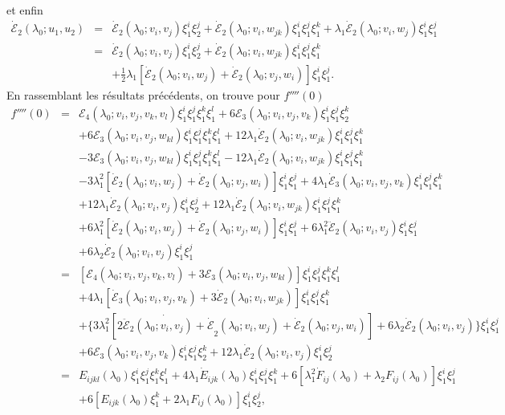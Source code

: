 \documentclass{article}
\begin{document}
et enfin
\begin{eqnarray*}
  \dot{\mathcal{E}}_2 (λ_0 ; u_1, u_2) & = & \dot{\mathcal{E}}_2
  (λ_0 ; v_i, v_j) \xi_1^i \xi_2^j + \dot{\mathcal{E}}_2 (λ_0 ;
  v_i, w_{j  k}) \xi_1^i \xi_1^j \xi_1^k + λ_1
  \dot{\mathcal{E}}_2 (λ_0 ; v_i, w_j) \xi_1^i \xi_1^j\\
  & = & \dot{\mathcal{E}}_2 (λ_0 ; v_i, v_j) \xi_1^i \xi_2^j +
  \dot{\mathcal{E}}_2 (λ_0 ; v_i, w_{j  k}) \xi_1^i \xi_1^j
  \xi_1^k\\
  &  &  + \tfrac{1}{2} λ_1  [\dot{\mathcal{E}}_2 (λ_0 ;
  v_i, w_j) + \dot{\mathcal{E}}_2 (λ_0 ; v_j, w_i)] \xi_1^i \xi_1^j .
\end{eqnarray*}
En rassemblant les résultats précédents, on trouve pour $f''''
(0)$
\begin{eqnarray*}
  f'''' (0) & = & \mathcal{E}_4 (λ_0 ; v_i, v_j, v_k {, v_l} ) \xi_1^i
  \xi_1^j \xi_1^k \xi_1^l + 6\mathcal{E}_3 (λ_0 ; v_i, v_j, v_k) \xi_1^i
  \xi_1^j \xi_2^k\\
  &  &  + 6\mathcal{E}_3 (λ_0 ; v_i, v_j, w_{k  l})
  \xi_1^i \xi_1^j \xi_1^k \xi_1^l + 12 λ_1  \dot{\mathcal{E}}_2
  (λ_0 ; v_{i }, w_{j  k}) \xi_1^i \xi_1^j \xi_1^k\\
  &  &  - 3\mathcal{E}_3 (λ_0 ; v_i, v_j, w_{k  l})
  \xi_1^i \xi_1^j \xi_1^k \xi_1^l - 12 λ_1  \dot{\mathcal{E}}_2
  (λ_0 ; v_i, w_{j  k}) \xi_1^i \xi_1^j \xi_1^k\\
  &  &  - 3 λ_1^2  [\dot{\mathcal{E}}_2 (λ_0 ; v_i, w_j)
  + \dot{\mathcal{E}}_2 (λ_0 ; v_j, w_i)] \xi_1^i \xi_1^j + 4 λ_1
  \dot{\mathcal{E}}_3 (λ_0 ; v_i, v_j, v_k) \xi_1^i \xi_1^j \xi_1^k\\
  &  &  + 12 λ_1  \dot{\mathcal{E}}_2 (λ_0 ; v_i,
  v_j) \xi_1^i \xi_2^j + 12 λ_1  \dot{\mathcal{E}}_2 (λ_0 ;
  v_i, w_{j  k}) \xi_1^i \xi_1^j \xi_1^k\\
  &  &  + 6 λ_1^2  [\dot{\mathcal{E}}_2 (λ_0 ; v_i,
  w_j) + \dot{\mathcal{E}}_2 (λ_0 ; v_j, w_i)] \xi_1^i \xi_1^j + 6
  λ_1^2  \ddot{\mathcal{E}}_2 (λ_0 ; v_i, v_j) \xi_1^i \xi_1^j\\
  &  &  + 6 λ_2  \dot{\mathcal{E}}_2 (λ_0 ; v_i, v_j)
  \xi_1^i \xi_1^j\\
  & = & \left[ \mathcal{E}_4 (λ_0 ; v_i, v_j, v_k {, v_l} ) +
  3\mathcal{E}_3 (λ_0 ; v_i, v_j, w_{k  l}) \right] \xi_1^i
  \xi_1^j \xi_1^k \xi_1^l\\
  &  &  + 4 λ_1  [\dot{\mathcal{E}}_3 (λ_0 ; v_i, v_j,
  v_k) + 3 \dot{\mathcal{E}}_2 (λ_0 ; v_i, w_{j  k})] \xi_1^i
  \xi_1^j \xi_1^k\\
  &  &  + \{ 3 λ_1^2  [\dot{2 \ddot{\mathcal{E}}_2
  (λ_0 ; v_i, v_j) + \dot{\mathcal{E}}}_2 (λ_0 ; v_i, w_j) +
  \dot{\mathcal{E}}_2 (λ_0 ; v_j, w_i)] + 6 λ_2
  \dot{\mathcal{E}}_2 (λ_0 ; v_i, v_j) \} \xi_1^i \xi_1^j\\
  &  &  + 6\mathcal{E}_3 (λ_0 ; v_i, v_j, v_k) \xi_1^i \xi_1^j
  \xi_2^k + 12 λ_1  \dot{\mathcal{E}}_2 (λ_0 ; v_i, v_j)
  \xi_1^i \xi_2^j\\
  & = & E_{i  j  k  l} (λ_0) \xi_1^i \xi_1^j
  \xi_1^k \xi_1^l + 4 λ_1  \dot{E}_{i  j  k}
  (λ_0) \xi_1^i \xi_1^j \xi_1^k + 6 [λ_1^2  \dot{F}_{i
   j} (λ_0) + λ_2 F_{i  j} (λ_0)]
  \xi_1^i \xi_1^j\\
  &  &  + 6 [E_{i  j  k} (λ_0) \xi_1^k + 2
  λ_1 F_{i  j} (λ_0)] \xi_1^i \xi_2^j,
\end{eqnarray*}
\end{document}
